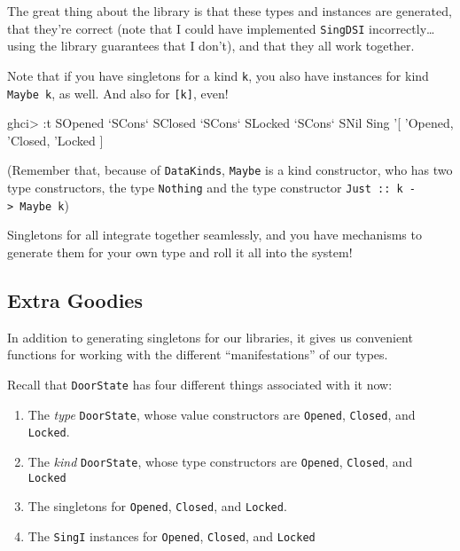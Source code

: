 \documentclass[]{article}
\newenvironment{Shaded}{}{}
\newcommand{\DataTypeTok}[1]{\textcolor[rgb]{0.56,0.13,0.00}{#1}}
\newcommand{\CharTok}[1]{\textcolor[rgb]{0.25,0.44,0.63}{#1}}
\newcommand{\OtherTok}[1]{\textcolor[rgb]{0.00,0.44,0.13}{#1}}
\newcommand{\FunctionTok}[1]{\textcolor[rgb]{0.02,0.16,0.49}{#1}}
\newcommand{\NormalTok}[1]{#1}
\begin{document}
The great thing about the library is that these types and instances are
generated, that they're correct (note that I could have implemented
\texttt{SingDSI} incorrectly\ldots{}using the library guarantees that I don't),
and that they all work together.

Note that if you have singletons for a kind \texttt{k}, you also have instances
for kind \texttt{Maybe\ k}, as well. And also for \texttt{{[}k{]}}, even!

\begin{Shaded}
\begin{Highlighting}[]
\NormalTok{ghci}\FunctionTok{>} \FunctionTok{:}\NormalTok{t }\DataTypeTok{SOpened} \OtherTok{`SCons`} \DataTypeTok{SClosed} \OtherTok{`SCons`} \DataTypeTok{SLocked} \OtherTok{`SCons`} \DataTypeTok{SNil}
\DataTypeTok{Sing} \CharTok{'[ '}\DataTypeTok{Opened}\NormalTok{, }\CharTok{'Closed, '}\DataTypeTok{Locked}\NormalTok{ ]}
\end{Highlighting}
\end{Shaded}

(Remember that, because of \texttt{DataKinds}, \texttt{Maybe} is a kind
constructor, who has two type constructors, the type
\texttt{\textquotesingle{}Nothing} and the type constructor
\texttt{\textquotesingle{}Just\ ::\ k\ -\textgreater{}\ Maybe\ k})

Singletons for all integrate together seamlessly, and you have mechanisms to
generate them for your own type and roll it all into the system!

\subsection{Extra Goodies}\label{extra-goodies}

In addition to generating singletons for our libraries, it gives us convenient
functions for working with the different ``manifestations'' of our types.

Recall that \texttt{DoorState} has four different things associated with it now:

\begin{enumerate}
\def\labelenumi{\arabic{enumi}.}
\tightlist
\item
  The \emph{type} \texttt{DoorState}, whose value constructors are
  \texttt{Opened}, \texttt{Closed}, and \texttt{Locked}.
\item
  The \emph{kind} \texttt{DoorState}, whose type constructors are
  \texttt{\textquotesingle{}Opened}, \texttt{\textquotesingle{}Closed}, and
  \texttt{\textquotesingle{}Locked}
\item
  The singletons for \texttt{\textquotesingle{}Opened},
  \texttt{\textquotesingle{}Closed}, and \texttt{\textquotesingle{}Locked}.
\item
  The \texttt{SingI} instances for \texttt{\textquotesingle{}Opened},
  \texttt{\textquotesingle{}Closed}, and
  \texttt{\textquotesingle{}Locked\textquotesingle{}}
\end{enumerate}
\end{document}

